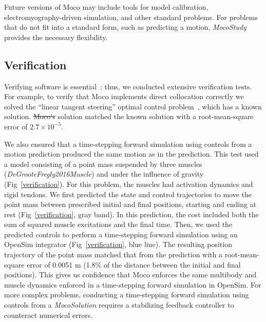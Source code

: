 \documentclass[10pt,letterpaper]{article}
\providecommand{\DIFaddtex}[1]{{\protect\color{blue}\uwave{#1}}} %
\providecommand{\DIFdeltex}[1]{{\protect\color{red}\sout{#1}}}                      %
\providecommand{\DIFaddbegin}{} %
\providecommand{\DIFaddend}{} %
\providecommand{\DIFdelbegin}{} %
\providecommand{\DIFdelend}{} %
\providecommand{\DIFadd}[1]{\texorpdfstring{\DIFaddtex{#1}}{#1}} %
\providecommand{\DIFdel}[1]{\texorpdfstring{\DIFdeltex{#1}}{}} %
\newcommand{\DIFscaledelfig}{0.5}
\newlength{\DIFdelgraphicswidth} %
\newlength{\DIFdelgraphicsheight} %
\newcommand{\DIFaddincludegraphics}[2][]{{\color{blue}\fbox{\DIFOincludegraphics[#1]{#2}}}} %
\newcommand{\DIFdelincludegraphics}[2][]{%
\sbox{\DIFdelgraphicsbox}{\DIFOincludegraphics[#1]{#2}}%
\settoboxwidth{\DIFdelgraphicswidth}{\DIFdelgraphicsbox} %
\settoboxtotalheight{\DIFdelgraphicsheight}{\DIFdelgraphicsbox} %
\scalebox{\DIFscaledelfig}{%
\parbox[b]{\DIFdelgraphicswidth}{\usebox{\DIFdelgraphicsbox}\\[-\baselineskip] \rule{\DIFdelgraphicswidth}{0em}}\llap{\resizebox{\DIFdelgraphicswidth}{\DIFdelgraphicsheight}{%
\setlength{\unitlength}{\DIFdelgraphicswidth}%
\begin{picture}(1,1)%
\thicklines\linethickness{2pt} %
{\color[rgb]{1,0,0}\put(0,0){\framebox(1,1){}}}%
{\color[rgb]{1,0,0}\put(0,0){\line( 1,1){1}}}%
{\color[rgb]{1,0,0}\put(0,1){\line(1,-1){1}}}%
\end{picture}%
}\hspace*{3pt}}} %
} %
\DeclareRobustCommand{\DIFaddbegin}{\DIFOaddbegin \let\includegraphics\DIFaddincludegraphics} %
\DeclareRobustCommand{\DIFaddend}{\DIFOaddend \let\includegraphics\DIFOincludegraphics} %
\DeclareRobustCommand{\DIFdelbegin}{\DIFOdelbegin \let\includegraphics\DIFdelincludegraphics} %
\DeclareRobustCommand{\DIFdelend}{\DIFOaddend \let\includegraphics\DIFOincludegraphics} %
\begin{document}
Future versions of Moco may include tools for model calibration, electromyography-driven simulation, and other standard problems. For problems that do not fit into a standard form, such as predicting a motion, \textit{MocoStudy} provides the necessary flexibility.


\subsection*{Verification}

Verifying software is essential~\cite{Hicks:2015bo}; thus, we conducted extensive verification tests. For example, to verify that Moco implements direct collocation correctly we solved the ``linear tangent steering'' optimal control problem~\cite{Bryson:1975}, which has a known solution. \DIFdelbegin \DIFdel{Moco's }\DIFdelend \DIFaddbegin \DIFadd{The }\DIFaddend solution matched the known solution with a root-mean-square error of $2.7 \times 10^{-5}$.

We also ensured that a time-stepping forward simulation using controls from a motion prediction produced the same motion as in the prediction. This test used a model consisting of a point mass suspended by three muscles (\textit{DeGrooteFregly2016Muscle}) and under the influence of gravity (Fig~\ref{verification}). For this problem, the muscles had activation dynamics and rigid tendons. We first predicted the state and control trajectories to move the point mass between prescribed initial and final positions, starting and ending at rest (Fig~\ref{verification}, gray band). In this prediction, the cost included both the sum of squared muscle excitations and the final time. Then, we used the predicted controls to perform a time-stepping forward simulation using an OpenSim integrator (Fig~\ref{verification}, blue line). The resulting position trajectory of the point mass matched that from the prediction with a root-mean-square error of 0.0051 m (1.8\% of the distance between the initial and final positions). This gives us confidence that Moco enforces the same multibody and muscle dynamics enforced in a time-stepping forward simulation in OpenSim. For more complex problems, conducting a time-stepping forward simulation using controls from a \textit{MocoSolution} requires a stabilizing feedback controller to counteract numerical errors.
\end{document}
